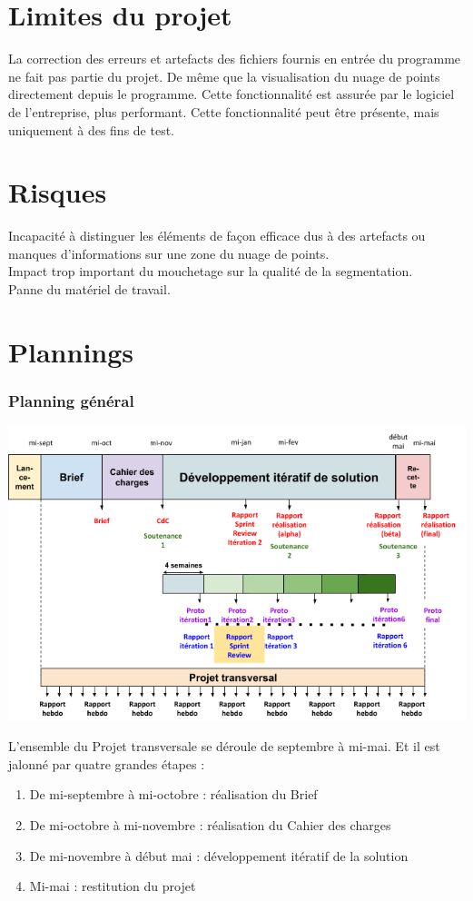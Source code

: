 \documentclass[12pt,titlepage,french]{article}
\begin{document}
\section{Limites du projet}

La correction des erreurs et artefacts des fichiers fournis en entrée du programme ne fait pas partie du projet.
De même que la visualisation du nuage de points directement depuis le programme. Cette fonctionnalité est assurée par le logiciel de l'entreprise, plus performant. Cette fonctionnalité peut être présente, mais uniquement à des fins de test.

\section{Risques}

Incapacité à distinguer les éléments de façon efficace dus à des artefacts ou manques d'informations sur une zone du nuage de points.\\
Impact trop important du mouchetage sur la qualité de la segmentation.\\
Panne du matériel de travail.

\section{Plannings}
\subsubsection*{Planning général}
\begin{center}
\includegraphics[width=\textwidth]{planning.png}
\label{fig:Planning général}
\end{center}
L'ensemble du Projet transversale se déroule de septembre à mi-mai. Et il est jalonné par quatre grandes étapes : 
\begin{enumerate}
\item De mi-septembre à mi-octobre : réalisation du Brief
\item De mi-octobre à mi-novembre : réalisation du Cahier des charges 
\item De mi-novembre à début mai : développement itératif de la solution
\item Mi-mai : restitution du projet
\end{enumerate}
\end{document}
